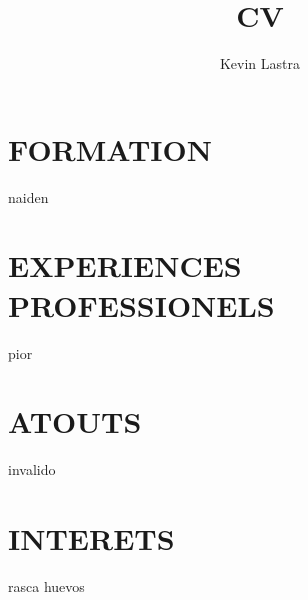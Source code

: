 \documentclass[a4paper]{article}
\title{CV}\author{Kevin Lastra}
\begin{document}
\maketitle
\section{FORMATION}
naiden
\section{EXPERIENCES PROFESSIONELS}
pior
\section{ATOUTS}
invalido
\section{INTERETS}
rasca huevos
\end{document}
